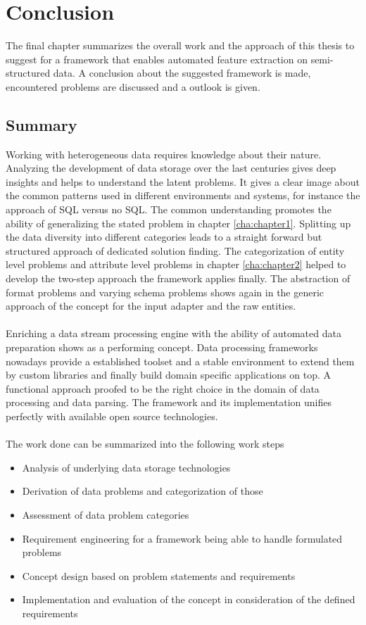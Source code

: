 \chapter{Conclusion\label{cha:chapter7}}

The final chapter summarizes the overall work and the approach of this thesis to suggest for a framework that enables automated feature extraction on semi-structured data. A conclusion about the suggested framework is made, encountered problems are discussed and a outlook is given.  

\section{Summary\label{sec:summary}}

Working with heterogeneous data requires knowledge about their nature. Analyzing the development of data storage over the last centuries gives deep insights and helps to understand the latent problems. It gives a clear image about the common patterns used in different environments and systems, for instance the approach of SQL versus no SQL. The common understanding promotes the ability of generalizing the stated problem in chapter \ref{cha:chapter1}. Splitting up the data diversity into different categories leads to a straight forward but structured approach of dedicated solution finding. The categorization of entity level problems and attribute level problems in chapter \ref{cha:chapter2} helped to develop the two-step approach the framework applies finally. The abstraction of format problems and varying schema problems shows again in the generic approach of the concept for the input adapter and the raw entities.
\\\\
Enriching a data stream processing engine with the ability of automated data preparation shows as a performing concept. Data processing frameworks nowadays provide a established toolset and a stable environment to extend them by custom libraries and finally build domain specific applications on top. A functional approach proofed to be the right choice in the domain of data processing and data parsing. The framework and its implementation unifies perfectly with available open source technologies. 
\\\\
\noindent The work done can be summarized into the following work steps

\begin{itemize}
\item Analysis of underlying data storage technologies
\item Derivation of data problems and categorization of those
\item Assessment of data problem categories
\item Requirement engineering for a framework being able to handle formulated problems
\item Concept design based on problem statements and requirements
\item Implementation and evaluation of the concept in consideration of the defined requirements
\end{itemize}

